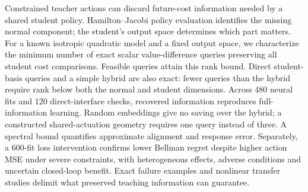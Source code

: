 Constrained teacher actions can discard future-cost information needed
by a shared student policy. Hamilton--Jacobi policy evaluation identifies
the missing normal component; the student's output space determines
which part matters. For a known isotropic quadratic model and a fixed
output space, we characterize the minimum number of exact scalar
value-difference queries preserving all student cost comparisons.
Feasible queries attain this rank bound. Direct student-basis queries
and a simple hybrid are also exact: fewer queries than the hybrid
require rank below both the normal and student dimensions. Across
480 neural fits and 120 direct-interface checks, recovered information
reproduces full-information learning. Random embeddings give no saving
over the hybrid; a constructed shared-actuation geometry requires one
query instead of three. A spectral bound quantifies approximate alignment
and response error. Separately, a 600-fit loss intervention confirms
lower Bellman regret despite higher action MSE under severe constraints,
with heterogeneous effects, adverse conditions and uncertain closed-loop
benefit. Exact failure examples and nonlinear transfer studies delimit
what preserved teaching information can guarantee.
